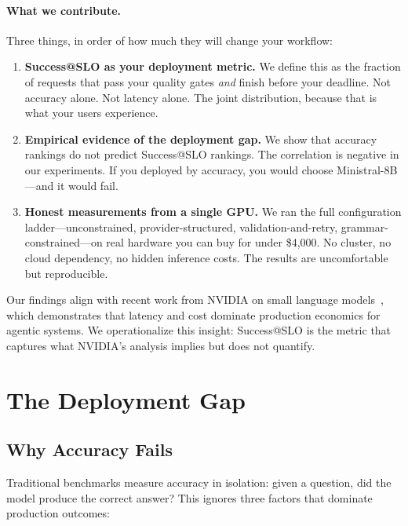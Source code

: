 \documentclass[11pt]{article}
\begin{document}
\paragraph{What we contribute.}
Three things, in order of how much they will change your workflow:

\begin{enumerate}[leftmargin=12pt]
    \item \textbf{Success@SLO as your deployment metric.}
    We define this as the fraction of requests that pass your quality gates \emph{and} finish before your deadline.
    Not accuracy alone.
    Not latency alone.
    The joint distribution, because that is what your users experience.

    \item \textbf{Empirical evidence of the deployment gap.}
    We show that accuracy rankings do not predict Success@SLO rankings.
    The correlation is negative in our experiments.
    If you deployed by accuracy, you would choose Ministral-8B---and it would fail.

    \item \textbf{Honest measurements from a single GPU.}
    We ran the full configuration ladder---unconstrained, provider-structured, validation-and-retry, grammar-constrained---on real hardware you can buy for under \$4,000.
    No cluster, no cloud dependency, no hidden inference costs.
    The results are uncomfortable but reproducible.
\end{enumerate}

Our findings align with recent work from NVIDIA on small language models~\citep{nvidia2025slm}, which demonstrates that latency and cost dominate production economics for agentic systems.
We operationalize this insight: Success@SLO is the metric that captures what NVIDIA's analysis implies but does not quantify.

\section{The Deployment Gap}
\label{sec:gap}

\subsection{Why Accuracy Fails}

Traditional benchmarks measure accuracy in isolation: given a question, did the model produce the correct answer?
This ignores three factors that dominate production outcomes:
\end{document}
